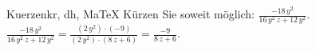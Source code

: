 \begin{MAufgabe}{Kuerzen}{kr, dh, MaTeX}
K\"urzen Sie soweit m\"oglich: $\frac{- 18\, y^2}{16\, y^2\, z + 12\, y^2}$.\\ 
\ifLsg\MLoesung
\quad $\frac{- 18\, y^2}{16\, y^2\, z + 12\, y^2}=\frac{(2\, y^2)\cdot(-9)}{(2\, y^2)\cdot(8\, z + 6)}=\frac{-9}{8\, z + 6}$.\else\relax\fi
 \end{MAufgabe}